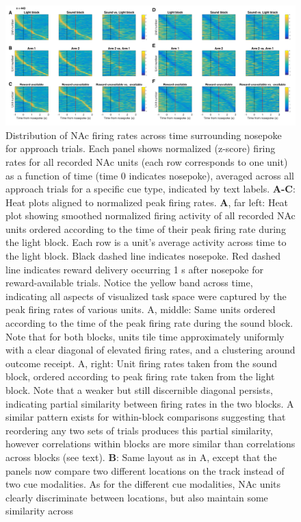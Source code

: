 \documentclass[11pt]{article}
\newcommand{\bsf}[1]{\textbf{#1}}
\begin{document}
 \begin{figure}[ht!]
\centering
\includegraphics[width=\textwidth]{Fig 12 - NP task tiling.pdf}
\caption{Distribution of NAc firing rates across time surrounding nosepoke for approach
trials. Each panel shows normalized (z-score) firing rates for all recorded NAc units
(each row corresponds to one unit) as a function of time (time 0 indicates
nosepoke), averaged across all approach trials for a specific cue type,
indicated by text labels. \bsf{A-C}: Heat plots aligned to normalized peak firing rates. \bsf{A}, far left: Heat plot showing smoothed
normalized firing activity of all recorded NAc units ordered according to the
time of their peak firing rate during the light block. Each row is a unit’s
average activity across time to the light block. Black dashed line indicates
nosepoke. Red dashed line indicates reward delivery occurring 1 s after
nosepoke for reward-available trials. Notice the yellow band across time,
indicating all aspects of visualized task space were captured by the peak
firing rates of various units. A, middle: Same units ordered according to
the time of the peak firing rate during the sound block. Note that for both
blocks, units tile time approximately uniformly with a clear diagonal of
elevated firing rates, and a clustering around outcome receipt. A, right: Unit firing rates taken from the sound block, ordered according to peak
firing rate taken from the light block. Note that a weaker but still
discernible diagonal persists, indicating partial similarity between firing
rates in the two blocks. A similar pattern exists for within-block comparisons suggesting that
reordering any two sets of trials produces this partial similarity, however
correlations within blocks are more similar than correlations across blocks
(see text). \bsf{B}: Same layout as in A, except
that the panels now compare two different locations on the track instead of
two cue modalities. As for the different cue modalities, NAc units clearly
discriminate between locations, but also maintain some similarity across
}
\end{figure}
\end{document}
